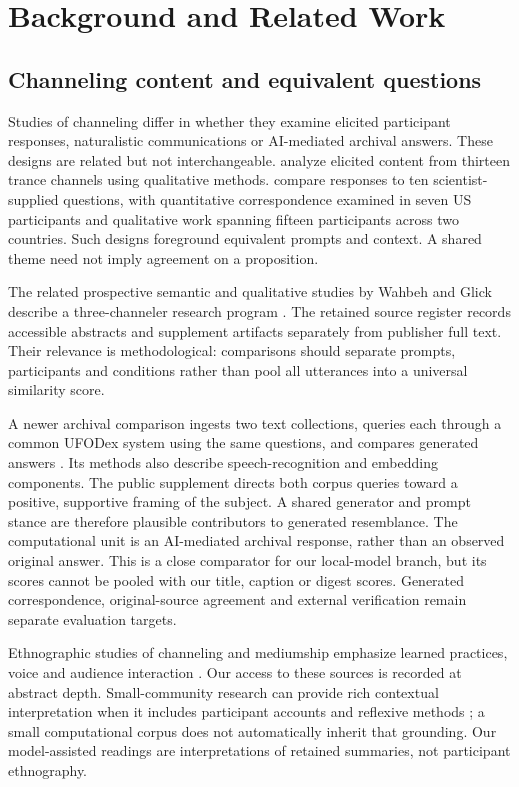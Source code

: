 \section{Background and Related Work}
\subsection{Channeling content and equivalent questions}
Studies of channeling differ in whether they examine elicited participant responses, naturalistic communications or AI-mediated archival answers. These designs are related but not interchangeable. \citet{anastasia2020qualitative} analyze elicited content from thirteen trance channels using qualitative methods. \citet{wahbeh2023answers} compare responses to ten scientist-supplied questions, with quantitative correspondence examined in seven US participants and qualitative work spanning fifteen participants across two countries. Such designs foreground equivalent prompts and context. A shared theme need not imply agreement on a proposition.

The related prospective semantic and qualitative studies by Wahbeh and Glick describe a three-channeler research program \citep{wahbeh2026semantic,wahbeh2026qualitative}. The retained source register records accessible abstracts and supplement artifacts separately from publisher full text. Their relevance is methodological: comparisons should separate prompts, participants and conditions rather than pool all utterances into a universal similarity score.

A newer archival comparison ingests two text collections, queries each through a common UFODex system using the same questions, and compares generated answers \citep{wahbeh2026records}. Its methods also describe speech-recognition and embedding components. The public supplement directs both corpus queries toward a positive, supportive framing of the subject. A shared generator and prompt stance are therefore plausible contributors to generated resemblance. The computational unit is an AI-mediated archival response, rather than an observed original answer. This is a close comparator for our local-model branch, but its scores cannot be pooled with our title, caption or digest scores. Generated correspondence, original-source agreement and external verification remain separate evaluation targets.

Ethnographic studies of channeling and mediumship emphasize learned practices, voice and audience interaction \citep{klinoron2014channel,tomlinson2019medium}. Our access to these sources is recorded at abstract depth. Small-community research can provide rich contextual interpretation when it includes participant accounts and reflexive methods \citep{claisse2023faith}; a small computational corpus does not automatically inherit that grounding. Our model-assisted readings are interpretations of retained summaries, not participant ethnography.

